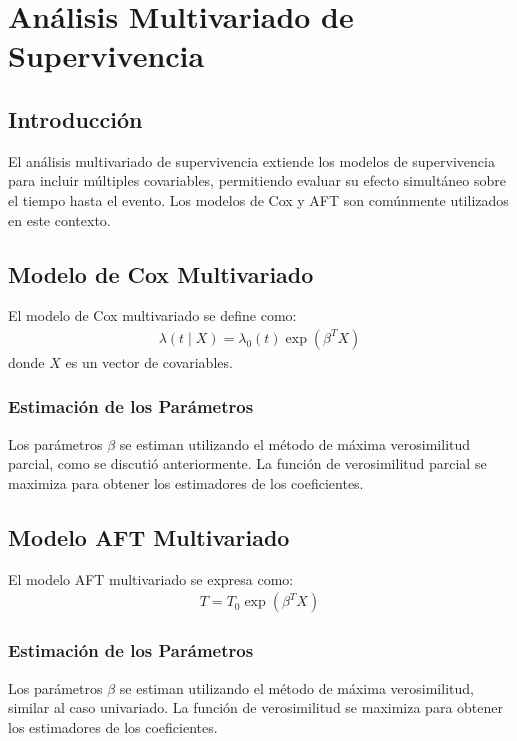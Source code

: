 \documentclass[a4paper]{report} %
\begin{document}
\chapter{An\'alisis Multivariado de Supervivencia}

\section{Introducci\'on}
El an\'alisis multivariado de supervivencia extiende los modelos de supervivencia para incluir m\'ultiples covariables, permitiendo evaluar su efecto simult\'aneo sobre el tiempo hasta el evento. Los modelos de Cox y AFT son com\'unmente utilizados en este contexto.

\section{Modelo de Cox Multivariado}
El modelo de Cox multivariado se define como:
\begin{eqnarray*}
\lambda(t \mid X) = \lambda_0(t) \exp(\beta^T X)
\end{eqnarray*}
donde $X$ es un vector de covariables.

\subsection{Estimaci\'on de los Par\'ametros}
Los par\'ametros $\beta$ se estiman utilizando el m\'etodo de m\'axima verosimilitud parcial, como se discuti\'o anteriormente. La funci\'on de verosimilitud parcial se maximiza para obtener los estimadores de los coeficientes.

\section{Modelo AFT Multivariado}
El modelo AFT multivariado se expresa como:
\begin{eqnarray*}
T = T_0 \exp(\beta^T X)
\end{eqnarray*}

\subsection{Estimaci\'on de los Par\'ametros}
Los par\'ametros $\beta$ se estiman utilizando el m\'etodo de m\'axima verosimilitud, similar al caso univariado. La funci\'on de verosimilitud se maximiza para obtener los estimadores de los coeficientes.
\end{document}
